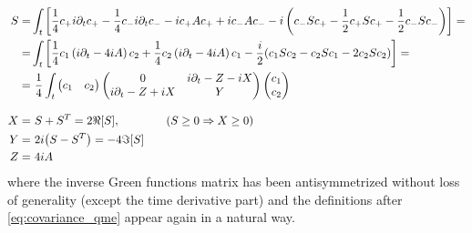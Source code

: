 \documentclass[a4paper,11pt]{article}
\theoremstyle{remark}
\newcommand{\np}{\vskip 1.3cm}
\begin{document}
   \begin{align}
    S =& \int_t \left[\frac{1}{4}c_+i\partial_tc_+-\frac{1}{4}c_-i\partial_tc_- -ic_+Ac_+ + ic_-Ac_- -i \left(c_-Sc_+ -\frac{1}{2}c_+Sc_+ -\frac{1}{2}c_-Sc_-\right)\right]= \notag\\ =& \int_t \left[ \frac{1}{4} c_1\left(i\partial_t -4iA\right)c_2 + \frac{1}{4} c_2\left(i\partial_t -4iA\right)c_1 -\frac{i}{2}(c_1Sc_2-c_2Sc_1-2c_2Sc_2) \right]= \notag \\
    =&\ \frac{1}{4} \int_t 
               \begin{pmatrix}
                c_1 & c_2
               \end{pmatrix}
               \begin{pmatrix}
                0 & i\partial_t - Z - iX \\ i\partial_t - Z + iX & Y
               \end{pmatrix}
               \begin{pmatrix}
                c_1 \\ c_2
               \end{pmatrix}\\[0.3cm]
    X =&\  S+S^T = 2\Re[S], \quad\quad\quad\quad (S\geq 0\Rightarrow X\geq 0) \notag\\
    Y =&\ 2i\big(S-S^T\big) = -4\Im[S] \notag \\
    Z =&\ 4iA \notag 
   \end{align}
   where the inverse Green functions matrix has been antisymmetrized without loss of generality (except the time derivative part) and the definitions after \eqref{eq:covariance_qme} appear again in a natural way.
  \np
\end{document}
